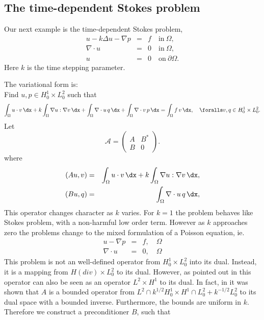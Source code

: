 \subsection{The time-dependent Stokes problem}
Our next example is the time-dependent Stokes problem,
\begin{eqnarray}
u - k \Delta u - \nabla p &=& f \quad \mbox{in} \ \Omega, \\ 
\nabla \cdot u &=& 0 \quad \mbox{in} \  \Omega, \\
             u &=& 0   \quad \mbox{on} \  \partial \Omega.  
\end{eqnarray}
Here $k$ is the time stepping parameter. 

The variational form is: \\ 
Find $u,p \in H^1_0 \times L_0^2$ such that  
\[
\int_\Omega u \cdot v \,  \dx + 
k \int_\Omega \nabla u : \nabla v \,  \dx + 
\int_\Omega \nabla \cdot u \, q \,  \dx +  
\int_\Omega \nabla \cdot v \, p \,  \dx = \int_\Omega f\, v\, \dx   , \quad
\foralls v,q \in H^1_0 \times L_0^2.
\]
Let 
\[
\mathcal{A}  =
\begin{pmatrix} A & B^* \\ B & 0 \end{pmatrix}.
\]
where 
\begin{eqnarray}
(A u, v) &=& \int_\Omega u \cdot v \,  \dx +  k \int_\Omega \nabla u :
\nabla v \,  \dx, \\  
(B u, q) &=& \int_\Omega \nabla \cdot u \, q \,  \dx,    
\end{eqnarray}
This operator changes character as $k$ varies.  
For $k=1$ the problem behaves like Stokes problem, with 
a non-harmful low order term. However as $k$ approaches
zero the problems change to the mixed formulation of 
a Poisson equation, ie. 
\begin{eqnarray}
u - \nabla p &=& f, \quad \Omega \\
\nabla \cdot u  &=& 0, \quad \Omega
\end{eqnarray}
This problem is not an well-defined operator from 
$H^1_0 \times L_0^2$ into its dual. Instead, it
is a mapping from $H(div) \times L_0^2$  to its dual. 
However, as pointed out in \citep{MardalWinther2004} this operator
can also be seen as an operator $L^2 \times H^1$ to its dual.  
In fact, in \citep{MardalTaiWinther2002a,MardalWinther2004} it was shown that 
 $A$ is a bounded operator from
$L^2 \cap k^{1/2} H^1_0 \times H^1 \cap L_0^2 + k^{-1/2} L_0^2$ to its dual space
with a bounded inverse. Furthermore, the bounds are uniform in $k$. 
Therefore we 
construct a preconditioner $B$, such that  
